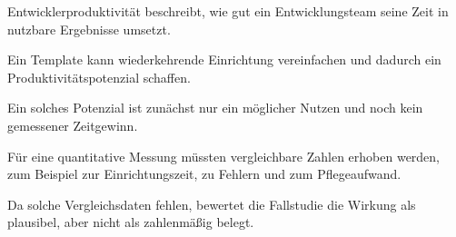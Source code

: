 \begin{beginnerstatement}

Entwicklerproduktivität beschreibt, wie gut ein Entwicklungsteam seine Zeit
in nutzbare Ergebnisse umsetzt.

Ein Template kann wiederkehrende Einrichtung vereinfachen und dadurch ein
Produktivitätspotenzial schaffen.

Ein solches Potenzial ist zunächst nur ein möglicher Nutzen und noch kein
gemessener Zeitgewinn.

Für eine quantitative Messung müssten vergleichbare Zahlen erhoben werden,
zum Beispiel zur Einrichtungszeit, zu Fehlern und zum Pflegeaufwand.

Da solche Vergleichsdaten fehlen, bewertet die Fallstudie die Wirkung als
plausibel, aber nicht als zahlenmäßig belegt.

\end{beginnerstatement}
